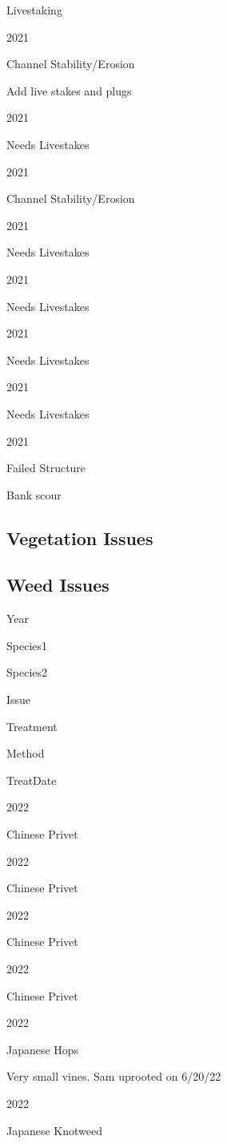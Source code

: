 \documentclass[
  landscape]{article}
\begin{document}
Livestaking

2021

Channel Stability/Erosion

Add live stakes and plugs

2021

Needs Livestakes

2021

Channel Stability/Erosion

2021

Needs Livestakes

2021

Needs Livestakes

2021

Needs Livestakes

2021

Needs Livestakes

2021

Failed Structure

Bank scour

\hypertarget{vegetation-issues}{%
\subsection{Vegetation Issues}\label{vegetation-issues}}

\hypertarget{weed-issues}{%
\subsection{Weed Issues}\label{weed-issues}}

Year

Species1

Species2

Issue

Treatment

Method

TreatDate

2022

Chinese Privet

2022

Chinese Privet

2022

Chinese Privet

2022

Chinese Privet

2022

Japanese Hops

Very small vines. Sam uprooted on 6/20/22

2022

Japanese Knotweed
\end{document}
